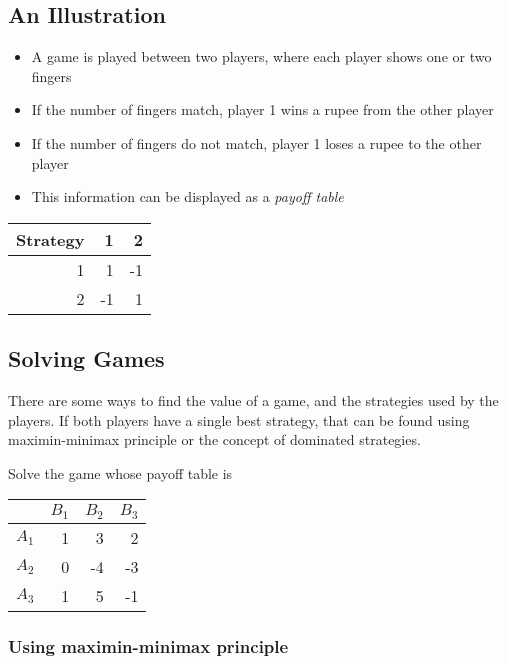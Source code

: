 \documentclass[12pt]{article}
\begin{document}
\subsection*{An Illustration}

\begin{itemize}
\item A game is played between two players, where each player shows one or two fingers
\item If the number of fingers match, player 1 wins a rupee from the other player
\item If the number of fingers do not match, player 1 loses a rupee to the other player
\item This information can be displayed as a \emph{payoff table}
\end{itemize}

\begin{center}
\begin{tabular}{|r|rr|}
\hline
 Strategy  &   1  &   2  \\
\hline
        1  &   1  &  -1  \\
        2  &  -1  &   1  \\
\hline
\end{tabular}
\end{center}

\subsection{Solving Games}
There are some ways to find the value of a game, and the strategies used by the players. If both players have a single best strategy, that can be found using maximin-minimax principle or the concept of dominated strategies.

Solve the game whose payoff table is

\begin{center}
\begin{tabular}{|r|rrr|}
\hline
        &  $B_1$  &  $B_2$  &  $B_3$  \\
\hline
 $A_1$  &      1  &      3  &      2  \\
 $A_2$  &      0  &     -4  &     -3  \\
 $A_3$  &      1  &      5  &     -1  \\
\hline
\end{tabular}
\end{center}
\subsubsection{Using maximin-minimax principle}
\end{document}
